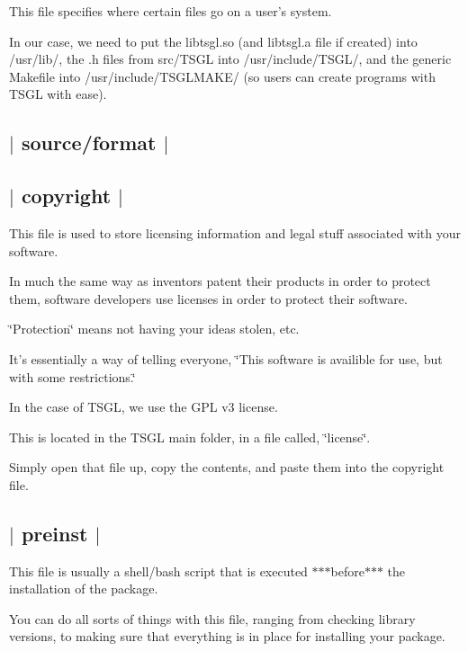 This file specifies where certain files go on a user's system.

In our case, we need to put the libtsgl.\-so (and libtsgl.\-a file if created) into /usr/lib/, the .h files from src/\-T\-S\-G\-L into /usr/include/\-T\-S\-G\-L/, and the generic Makefile into /usr/include/\-T\-S\-G\-L\-M\-A\-K\-E/ (so users can create programs with T\-S\-G\-L with ease).



 \subsection*{$\vert$ source/format $\vert$ }



 \subsection*{$\vert$ copyright $\vert$ }

This file is used to store licensing information and legal stuff associated with your software.

In much the same way as inventors patent their products in order to protect them, software developers use licenses in order to protect their software.

\char`\"{}\-Protection\char`\"{} means not having your ideas stolen, etc.

It's essentially a way of telling everyone, \char`\"{}\-This software is availible for use, but with some restrictions.\char`\"{}

In the case of T\-S\-G\-L, we use the G\-P\-L v3 license.

This is located in the T\-S\-G\-L main folder, in a file called, \char`\"{}license\char`\"{}.

Simply open that file up, copy the contents, and paste them into the copyright file. 

 \subsection*{$\vert$ preinst $\vert$ }

This file is usually a shell/bash script that is executed $\ast$$\ast$$\ast$before$\ast$$\ast$$\ast$ the installation of the package.

You can do all sorts of things with this file, ranging from checking library versions, to making sure that everything is in place for installing your package.


